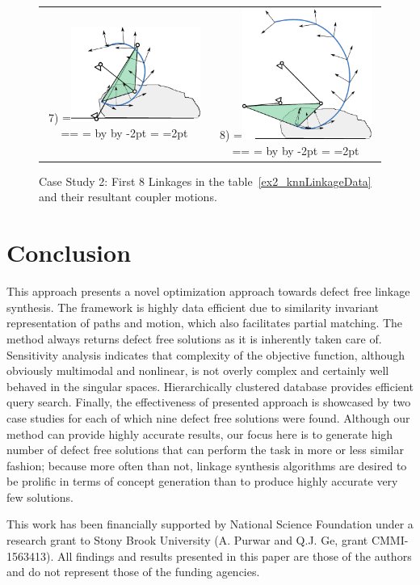 \documentclass[twocolumn,10pt]{asme2e}
\makeatletter
\newcommand{\putindeepbox}[2][0.7\baselineskip]{{%
    \setbox0=\hbox{#2}%
    \setbox0=\vbox{\noindent\hsize=\wd0\unhbox0}
    \@tempdima=\dp0
    \advance\@tempdima by \ht0
    \advance\@tempdima by -#1\relax
    \dp0=\@tempdima
    \ht0=#1\relax
    \box0
}}
\makeatother
\begin{document}
\begin{figure}
\begin{tabular}{cc}
  7)\putindeepbox[2pt]{\includegraphics[width=120pt]{figure/sol8.eps}}
    & 8)\putindeepbox[2pt]{\includegraphics[width=120pt]{figure/sol9.eps}}\\
\end{tabular}
\caption{Case Study 2: First 8 Linkages in the table~\ref{ex2_knnLinkageData} and their resultant coupler motions.}
\label{ex2_solns}
\end{figure}


\section*{Conclusion}
This approach presents a novel optimization approach towards defect free linkage synthesis.
The framework is highly data efficient due to similarity invariant representation of paths and motion, which also facilitates partial matching.
The method always returns defect free solutions as it is inherently taken care of.
Sensitivity analysis indicates that complexity of the objective function, although obviously multimodal and nonlinear, is not overly complex and certainly well behaved in the singular spaces.
Hierarchically clustered database provides efficient query search.
Finally, the effectiveness of presented approach is showcased by two case studies for each of which nine defect free solutions were found.
Although our method can provide highly accurate results, our focus here is to generate high number of defect free solutions that can perform the task in more or less similar fashion;
because more often than not, linkage synthesis algorithms are desired to be prolific in terms of concept generation than to produce highly accurate very few solutions.

\begin{acknowledgment}
This work has been financially supported by National Science Foundation under a research grant to Stony Brook University (A. Purwar and Q.J. Ge, grant CMMI-1563413). All findings and results presented in this paper are those of the authors and do not represent those of the funding agencies.
\end{acknowledgment}



\newpage
\clearpage
\listoftables
\listoffigures
\end{document}
